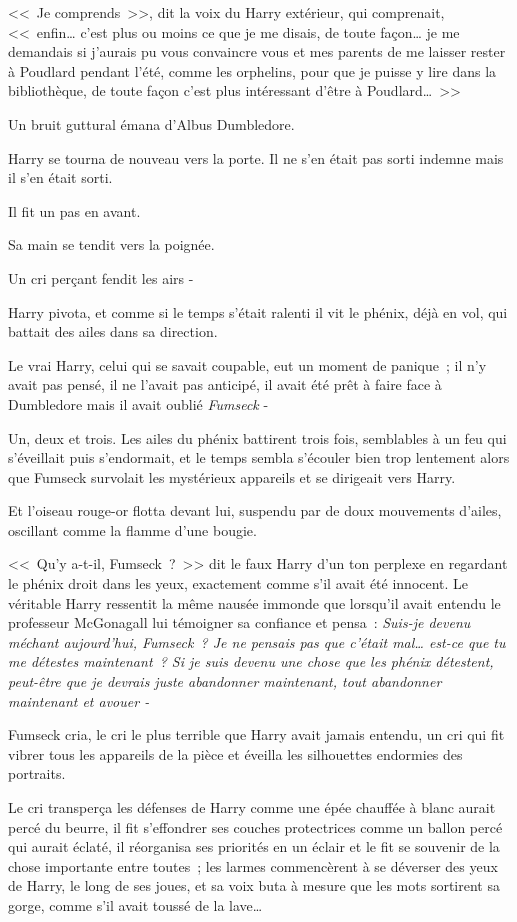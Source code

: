 <<~Je comprends~>>, dit la voix du Harry extérieur, qui comprenait, <<~enfin… c'est plus ou moins ce que je me disais, de toute façon… je me demandais si j'aurais pu vous convaincre vous et mes parents de me laisser rester à Poudlard pendant l'été, comme les orphelins, pour que je puisse y lire dans la bibliothèque, de toute façon c'est plus intéressant d'être à Poudlard…~>>

Un bruit guttural émana d'Albus Dumbledore.

Harry se tourna de nouveau vers la porte. Il ne s'en était pas sorti indemne mais il s'en était sorti.

Il fit un pas en avant.

Sa main se tendit vers la poignée.

Un cri perçant fendit les airs -

Harry pivota, et comme si le temps s'était ralenti il vit le phénix, déjà en vol, qui battait des ailes dans sa direction.

Le vrai Harry, celui qui se savait coupable, eut un moment de panique~; il n'y avait pas pensé, il ne l'avait pas anticipé, il avait été prêt à faire face à Dumbledore mais il avait oublié \emph{Fumseck} -

Un, deux et trois. Les ailes du phénix battirent trois fois, semblables à un feu qui s'éveillait puis s'endormait, et le temps sembla s'écouler bien trop lentement alors que Fumseck survolait les mystérieux appareils et se dirigeait vers Harry.

Et l'oiseau rouge-or flotta devant lui, suspendu par de doux mouvements d'ailes, oscillant comme la flamme d'une bougie.

<<~Qu'y a-t-il, Fumseck~?~>> dit le faux Harry d'un ton perplexe en regardant le phénix droit dans les yeux, exactement comme s'il avait été innocent. Le véritable Harry ressentit la même nausée immonde que lorsqu'il avait entendu le professeur McGonagall lui témoigner sa confiance et pensa~: \emph{Suis-je devenu méchant aujourd'hui, Fumseck~? Je ne pensais pas que c'était mal… est-ce que tu me détestes maintenant~? Si je suis devenu une chose que les phénix détestent, peut-être que je devrais juste abandonner maintenant, tout abandonner maintenant et avouer -}

Fumseck cria, le cri le plus terrible que Harry avait jamais entendu, un cri qui fit vibrer tous les appareils de la pièce et éveilla les silhouettes endormies des portraits.

Le cri transperça les défenses de Harry comme une épée chauffée à blanc aurait percé du beurre, il fit s'effondrer ses couches protectrices comme un ballon percé qui aurait éclaté, il réorganisa ses priorités en un éclair et le fit se souvenir de la chose importante entre toutes~; les larmes commencèrent à se déverser des yeux de Harry, le long de ses joues, et sa voix buta à mesure que les mots sortirent sa gorge, comme s'il avait toussé de la lave…

